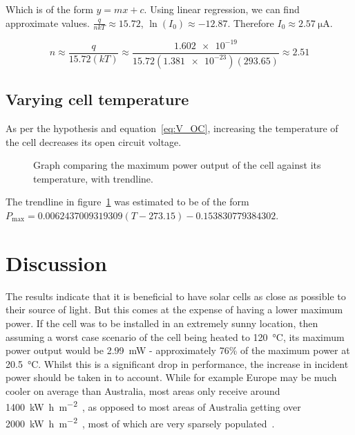 \documentclass[a4paper,11pt]{article}
\begin{document}
Which is of the form $y = mx + c$. Using linear regression, we can find approximate values. $\frac{q}{nkT} \approx 15.72$, $\ln{(I_0)} \approx -12.87$. Therefore $I_0 \approx \SI{2.57}{\micro\ampere}$.

\begin{displaymath}
n \approx \frac{q}{15.72(kT)} \approx \frac{\num{1.602e-19}}{15.72(\num{1.381e-23})(293.65)} \approx 2.51
\end{displaymath}

\subsection{Varying cell temperature}
As per the hypothesis and equation~\ref{eq:V_OC}, increasing the temperature of the cell decreases its open circuit voltage.

\begin{figure}[h]
\centering
{}
\caption{Graph comparing the maximum power output of the cell against its temperature, with trendline.}
\label{plot:tempPower}
\end{figure}

The trendline in figure~\ref{plot:tempPower} was estimated to be of the form $P_{\textrm{max}} = 0.0062437009319309(T-273.15)-0.153830779384302$.


\section{Discussion}
The results indicate that it is beneficial to have solar cells as close as possible to their source of light. But this comes at the expense of having a lower maximum power. If the cell was to be installed in an extremely sunny location, then assuming a worst case scenario of the cell being heated to \SI{120}{\celsius}, its maximum power output would be \SI{2.99}{\milli\watt} - approximately 76\% of the maximum power at \SI{20.5}{\celsius}. Whilst this is a significant drop in performance, the increase in incident power should be taken in to account. While for example Europe may be much cooler on average than Australia, most areas only receive around \SI{1400}{\kilo\watt\hour\per\metre\squared}~\cite{solarMapEur}, as opposed to most areas of Australia getting over \SI{2000}{\kilo\watt\hour\per\metre\squared}~\cite{solarMapAus}, most of which are very sparsely populated~\cite{ausPopulationMap}.
\end{document}
